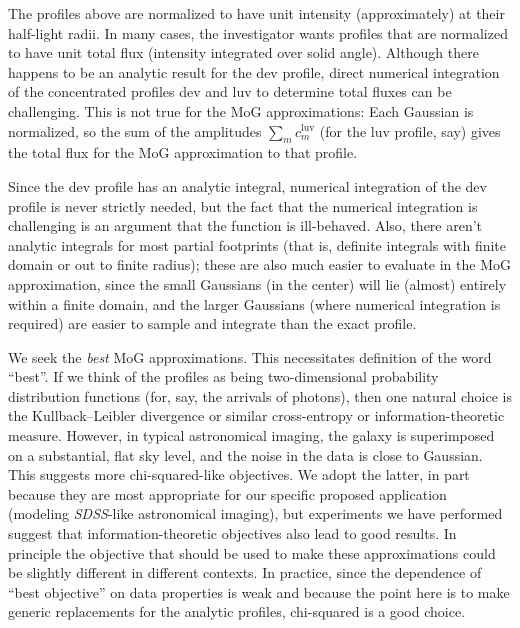 \documentclass[12pt,pdftex,preprint]{aastex}
\newcommand{\project}[1]{\textsl{#1}}
\newcommand{\sdss}{\project{SDSS}}
\newcommand{\luv}{\mathrm{luv}}
\begin{document}
The profiles above are normalized to have unit intensity
(approximately) at their half-light radii.  In many cases, the
investigator wants profiles that are normalized to have unit total
flux (intensity integrated over solid angle).  Although there happens
to be an analytic result for the dev profile, direct numerical
integration of the concentrated profiles dev and luv to determine
total fluxes can be challenging.  This is not true for the MoG
approximations: Each Gaussian is normalized, so the sum of the
amplitudes $\sum_m c^{\luv}_m$ (for the luv profile, say) gives the
total flux for the MoG approximation to that profile.

Since the dev profile has an analytic integral, numerical integration
of the dev profile is never strictly needed, but the fact that the
numerical integration is challenging is an argument that the function
is ill-behaved.  Also, there aren't analytic integrals for most
partial footprints (that is, definite integrals with finite domain or
out to finite radius); these are also much easier to evaluate in the
MoG approximation, since the small Gaussians (in the center) will lie
(almost) entirely within a finite domain, and the larger Gaussians
(where numerical integration is required) are easier to sample and
integrate than the exact profile.

We seek the \emph{best} MoG approximations.  This necessitates
definition of the word ``best''.  If we think of the profiles as being
two-dimensional probability distribution functions (for, say, the
arrivals of photons), then one natural choice is the Kullback--Leibler
divergence or similar cross-entropy or information-theoretic measure.
However, in typical astronomical imaging, the galaxy is superimposed
on a substantial, flat sky level, and the noise in the data is close
to Gaussian.  This suggests more chi-squared-like objectives.  We
adopt the latter, in part because they are most appropriate for our
specific proposed application (modeling \sdss-like astronomical
imaging), but experiments we have performed suggest that
information-theoretic objectives also lead to good results.  In
principle the objective that should be used to make these
approximations could be slightly different in different contexts.  In
practice, since the dependence of ``best objective'' on data
properties is weak and because the point here is to make generic
replacements for the analytic profiles, chi-squared is a good choice.
\end{document}
